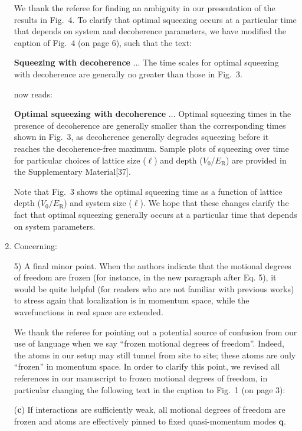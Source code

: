 \documentclass[reprint,onecolumn,12pt]{revtex4-2}
\renewcommand{\t}{\text} %
\renewcommand{\v}{\bm} %
\newcommand{\blue}[1]{{\color{blue} #1}}
\newcommand{\red}[1]{{\color{red} #1}}
\newcommand{\green}[1]{{\color{ForestGreen} #1}}
\begin{document}
\begin{enumerate}
  We thank the referee for finding an ambiguity in our presentation of
  the results in Fig.~4.  To clarify that optimal squeezing occurs at
  a particular time that depends on system and decoherence parameters,
  we have modified the caption of Fig.~4 (on page 6), such that the
  text:

  \red{{\bf Squeezing with decoherence} ... The time scales for
    optimal squeezing with decoherence are generally no greater than
    those in Fig.~3.}

  now reads:

  \green{{\bf Optimal squeezing with decoherence} ... Optimal
    squeezing times in the presence of decoherence are generally
    smaller than the corresponding times shown in Fig.~3, as
    decoherence generally degrades squeezing before it reaches the
    decoherence-free maximum.  Sample plots of squeezing over time for
    particular choices of lattice size ($\ell$) and depth
    ($V_0/E_{\t{R}}$) are provided in the Supplementary
    Material[37].}

  Note that Fig.~3 shows the optimal squeezing time as a function of
  lattice depth ($V_0/E_{\t{R}}$) and system size ($\ell$).  We hope
  that these changes clarify the fact that optimal squeezing generally
  occurs at a particular time that depends on system parameters.


\item Concerning:

  \blue{5) A final minor point. When the authors indicate that the
    motional degrees of freedom are frozen (for instance, in the new
    paragraph after Eq. 5), it would be quite helpful (for readers who
    are not familiar with previous works) to stress again that
    localization is in momentum space, while the wavefunctions in real
    space are extended.}

  We thank the referee for pointing out a potential source of
  confusion from our use of language when we say ``frozen motional
  degrees of freedom''.  Indeed, the atoms in our setup may still
  tunnel from site to site; these atoms are only ``frozen'' in
  momentum space.  In order to clarify this point, we revised all
  references in our manuscript to frozen motional degrees of freedom,
  in particular changing the following text in the caption to Fig.~1
  (on page 3):

  \red{({\bf c}) If interactions are sufficiently weak, all motional
    degrees of freedom are frozen and atoms are effectively pinned to
    fixed quasi-momentum modes $\v q$.}


\end{enumerate}
\end{document}
